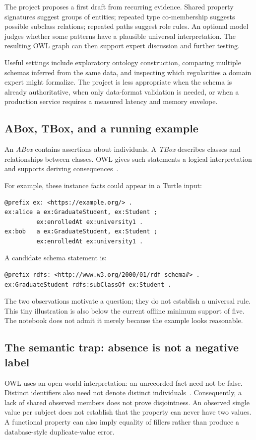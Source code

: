 \documentclass[11pt,a4paper]{article}
\begin{document}
The project proposes a first draft from recurring evidence. Shared property
signatures suggest groups of entities; repeated type co-membership suggests
possible subclass relations; repeated paths suggest role rules. An optional
model judges whether some patterns have a plausible universal interpretation.
The resulting OWL graph can then support expert discussion and further testing.

Useful settings include exploratory ontology construction, comparing multiple
schemas inferred from the same data, and inspecting which regularities a domain
expert might formalize. The project is less appropriate when the schema is
already authoritative, when only data-format validation is needed, or when a
production service requires a measured latency and memory envelope.

\subsection{ABox, TBox, and a running example}
An \emph{ABox} contains assertions about individuals. A \emph{TBox} describes
classes and relationships between classes. OWL gives such statements a logical
interpretation and supports deriving consequences~\cite{owl-primer}.

For example, these instance facts could appear in a Turtle input:
\begin{lstlisting}
@prefix ex: <https://example.org/> .
ex:alice a ex:GraduateStudent, ex:Student ;
         ex:enrolledAt ex:university1 .
ex:bob   a ex:GraduateStudent, ex:Student ;
         ex:enrolledAt ex:university1 .
\end{lstlisting}
A candidate schema statement is:
\begin{lstlisting}
@prefix rdfs: <http://www.w3.org/2000/01/rdf-schema#> .
ex:GraduateStudent rdfs:subClassOf ex:Student .
\end{lstlisting}
The two observations motivate a question; they do not establish a universal
rule. This tiny illustration is also below the current offline minimum support
of five. The notebook does not admit it merely because the example looks
reasonable.

\subsection{The semantic trap: absence is not a negative label}
OWL uses an open-world interpretation: an unrecorded fact need not be false.
Distinct identifiers also need not denote distinct individuals~\cite{owl-primer}.
Consequently, a lack of shared observed members does not prove disjointness.
An observed single value per subject does not establish that the property can
never have two values. A functional property can also imply equality of fillers
rather than produce a database-style duplicate-value error.
\end{document}
